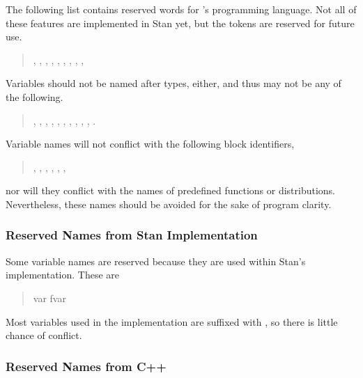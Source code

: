 The following list contains reserved words for \Stan's programming
language.  Not all of these features are implemented in Stan yet, but
the tokens are reserved for future use.
%
\begin{quote}
,
,
,
,
,
,
,
,
, 
\end{quote}
%
Variables should not be named after types, either, and thus may not be
any of the following.
%
\begin{quote}
,
,
,
,
,
,
,
,
,
,
.
\end{quote}
%
Variable names will not conflict with the following block identifiers,
%
\begin{quote}
,
,
,
,
, 
,
\end{quote}
%
nor will they conflict with the names of predefined functions or
distributions.  Nevertheless, these names should be avoided for the
sake of program clarity.

\subsubsection{Reserved Names from Stan Implementation}

Some variable names are reserved because they are used within
Stan's \Cpp implementation.  These are
%
\begin{quote}
var
fvar
\end{quote}
%
Most variables used in the implementation are suffixed with
\code{\_\_}, so there is little chance of conflict.

\subsubsection{Reserved Names from C++}

